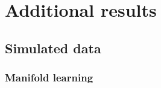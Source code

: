 \documentclass[final,supplement]{siamart1116}
\begin{document}
\maketitle

\section{Additional results}
\label{sec:Additional-results}
\subsection{Simulated data}
\subsubsection{Manifold learning}
\label{ssec:Additional-results-manifold-learning}
\end{document}
